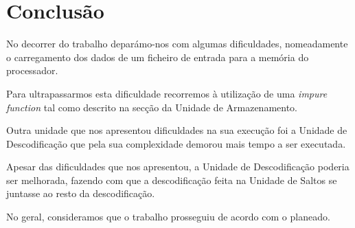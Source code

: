 \chapter{Conclusão}
No decorrer do trabalho deparámo-nos com algumas dificuldades, nomeadamente o carregamento dos dados de um ficheiro de entrada para a memória do processador.\par
Para ultrapassarmos esta dificuldade recorremos à utilização de uma \textit{impure function} tal como descrito na secção da Unidade de Armazenamento.\par
Outra unidade que nos apresentou dificuldades na sua execução foi a Unidade de Descodificação que pela sua complexidade demorou mais tempo a ser executada.\par
Apesar das dificuldades que nos apresentou, a Unidade de Descodificação poderia ser melhorada, fazendo com que a descodificação feita na Unidade de Saltos se juntasse ao resto da descodificação.\par
No geral, consideramos que o trabalho prosseguiu de acordo com o planeado.